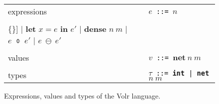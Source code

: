 \begin{figure}
  \begin{tabular}[t]{l l}
    expressions & \texttt{$e$ ::= $n$} \\
    & \begin{minipage}{0.6\textwidth}
      \begin{Verbatim}[mathescape,commandchars=\\\{\}]
    | \textbf{let} $x = e$ \textbf{in} $e'$
    | \textbf{dense} $n\ m$
    | $e\ \obar\ e'$
    | $e\ \ominus\ e'$
      \end{Verbatim} 
      \end{minipage} \\

    & \\ %

    values
    & \texttt{$v$ ::= $\textbf{net}\ n\ m$} \\
    
    & \\ %
    types
    & \texttt{$\tau$ ::= \textbf{int} | \textbf{net} $n\ m$} \\
  \end{tabular}

  \caption{Expressions, values and types of the Volr language.}
  \label{fig:volr-expr}
\end{figure}
